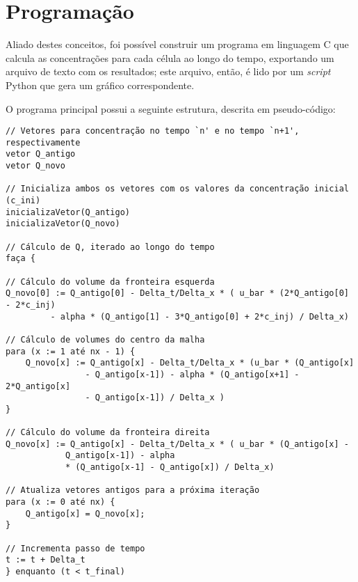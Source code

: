 \section{Programação}
Aliado destes conceitos, foi possível construir um programa em linguagem C que
calcula as concentrações para cada célula ao longo do tempo, exportando um
arquivo de texto com os resultados; este arquivo, então, é lido por um
\textit{script} Python que gera um gráfico correspondente.

O programa principal possui a seguinte estrutura, descrita em pseudo-código:

\begin{verbatim}
// Vetores para concentração no tempo `n' e no tempo `n+1', respectivamente
vetor Q_antigo
vetor Q_novo

// Inicializa ambos os vetores com os valores da concentração inicial (c_ini)
inicializaVetor(Q_antigo)
inicializaVetor(Q_novo)

// Cálculo de Q, iterado ao longo do tempo
faça {

// Cálculo do volume da fronteira esquerda
Q_novo[0] := Q_antigo[0] - Delta_t/Delta_x * ( u_bar * (2*Q_antigo[0] - 2*c_inj)
         - alpha * (Q_antigo[1] - 3*Q_antigo[0] + 2*c_inj) / Delta_x)

// Cálculo de volumes do centro da malha
para (x := 1 até nx - 1) {
    Q_novo[x] := Q_antigo[x] - Delta_t/Delta_x * (u_bar * (Q_antigo[x]
                - Q_antigo[x-1]) - alpha * (Q_antigo[x+1] - 2*Q_antigo[x]
                - Q_antigo[x-1]) / Delta_x )
}

// Cálculo do volume da fronteira direita
Q_novo[x] := Q_antigo[x] - Delta_t/Delta_x * ( u_bar * (Q_antigo[x] -
            Q_antigo[x-1]) - alpha
            * (Q_antigo[x-1] - Q_antigo[x]) / Delta_x)

// Atualiza vetores antigos para a próxima iteração
para (x := 0 até nx) {
    Q_antigo[x] = Q_novo[x];
}

// Incrementa passo de tempo
t := t + Delta_t
} enquanto (t < t_final)

\end{verbatim}


